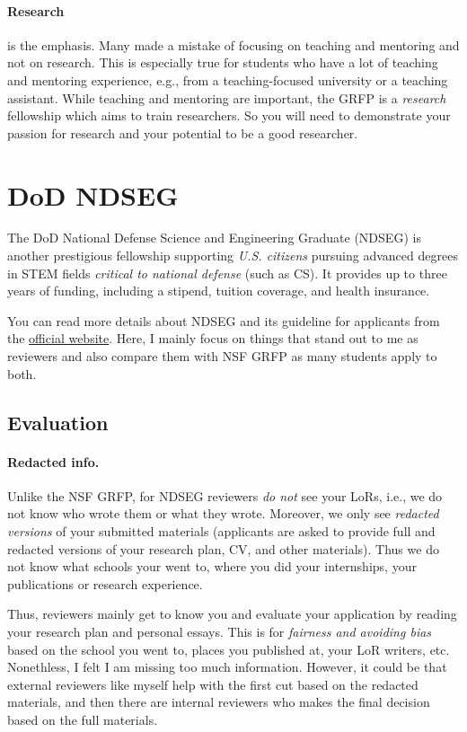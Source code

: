 \documentclass[oneside,11pt,dvipsnames]{book}
\begin{document}
\paragraph{Research} is the emphasis.  Many made a mistake of focusing on teaching and mentoring and not on research. This is especially true for students who have a lot of teaching and mentoring experience, e.g., from a teaching-focused university or a teaching assistant.  While teaching and mentoring are important, the GRFP is a \emph{research} fellowship which aims to train researchers. So you will need to demonstrate your passion for research and your potential to be a good researcher.  

\section{DoD NDSEG}

The DoD National Defense Science and Engineering Graduate (NDSEG) is another prestigious fellowship supporting \emph{U.S. citizens} pursuing advanced degrees in STEM fields \emph{critical to national defense} (such as CS).
It provides up to three years of funding, including a  stipend, tuition coverage, and health insurance.

You can read more details about NDSEG and its guideline for applicants from the \href{https://www.ndsegfellowships.org/}{official website}. Here, I mainly focus on things that stand out to me as reviewers and also compare them with NSF GRFP as many students apply to both.
\subsection{Evaluation}

\paragraph{Redacted info.} Unlike the NSF GRFP, for NDSEG reviewers \emph{do not} see your LoRs, i.e., we do not know who wrote them or what they wrote. Moreover, we only see \emph{redacted versions} of your submitted materials (applicants are asked to provide full and redacted versions of your research plan, CV, and other materials). Thus we do not know what schools your went to, where you did your internships, your publications or research experience.

Thus, reviewers mainly get to know you and evaluate your application by reading your research plan and personal essays. This is for \emph{fairness and avoiding bias} based on the school you went to, places you published at, your LoR writers, etc.  Nonethless, I felt I am missing too much information. However, it could be that external reviewers like myself help with the first cut based on the redacted materials, and then there are internal reviewers who makes the final decision based on the full materials. 
\end{document}
